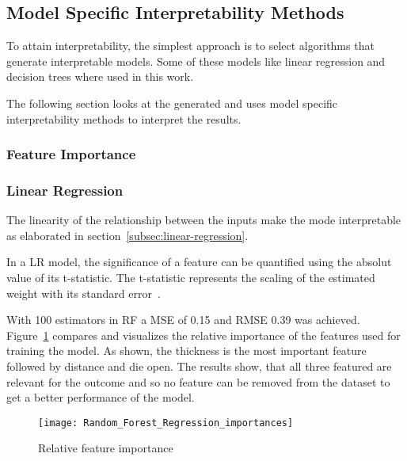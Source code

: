 \subsection{Model Specific Interpretability
Methods}\label{subsec:model-specific-interpretability
-methods}

To attain interpretability, the simplest approach is to select algorithms
that generate
interpretable models.
Some of these models like linear regression and decision trees where used in
this work.

The following section looks at the generated and uses model specific
interpretability methods to
interpret the results.

\subsubsection{Feature Importance}

\subsubsection{Linear Regression}\label{subsubsec:linear-regression}
The linearity of the relationship between the inputs make the mode
interpretable as elaborated in section~\ref{subsec:linear-regression}.

In a \ac{LR} model, the significance of a feature can be quantified using the
absolut value of its t-statistic. The t-statistic represents the scaling of
the estimated weight with its standard error~\cite[p.
40]{molnar2020interpretable}.

With 100 estimators in \ac{RF} a \ac{MSE} of 0.15 and \ac{RMSE} 0.39 was
achieved.
Figure~\ref{fig:rf_feature_importance} compares and visualizes the relative
importance of the
features used for
training the model.
As shown, the thickness is the most important feature followed by distance
and die open. The
results show, that all
three featured are relevant for the outcome and so no feature can be removed
from the dataset to
get a better
performance of the model.

\begin{figure}[H]
    \begin{tcolorbox}[arc=0pt,boxrule=0.5pt]
        \centering
        \texttt{[image: Random\_Forest\_Regression\_importances]}
        \caption{Relative feature importance}
        \label{fig:rf_feature_importance}
    \end{tcolorbox}
\end{figure}

